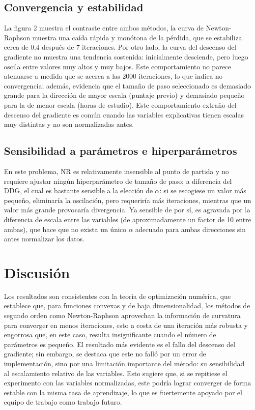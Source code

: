 \subsection{Convergencia y estabilidad}

La figura 2 muestra el contraste entre ambos métodos, la curva de Newton-Raphson muestra una caída rápida y monótona de la pérdida, que se estabiliza cerca de 0,4 después de 7 iteraciones. Por otro lado, la curva del descenso del gradiente no muestra una tendencia sostenida: inicialmente desciende, pero luego oscila entre valores muy altos y muy bajos. Este comportamiento no parece atenuarse a medida que se acerca a las 2000 iteraciones, lo que indica no convergencia; además, evidencia que el tamaño de paso seleccionado es demasiado grande para la dirección de mayor escala (puntaje previo) y demasiado pequeño para la de menor escala (horas de estudio). Este comportamiento extraño del descenso del gradiente es común cuando las variables explicativas tienen escalas muy distintas y no son normalizadas antes.

\subsection{Sensibilidad a parámetros e hiperparámetros}

En este problema, NR es relativamente insensible al punto de partida y no requiere ajustar ningún hiperparámetro de tamaño de paso; a diferencia del DDG, el cual es bastante sensible a la elección de $\alpha$: si se escogiese un valor más pequeño, eliminaría la oscilación, pero requeriría más iteraciones, mientras que un valor más grande provocaría divergencia. Ya sensible de por sí, es agravada por la diferencia de escala entre las variables (de aproximadamente un factor de 10 entre ambas), que hace que no exista un único $\alpha$ adecuado para ambas direcciones sin antes normalizar los datos.

\section{Discusión}

Los resultados son consistentes con la teoría de optimización numérica, que establece que, para funciones convexas y de baja dimensionalidad, los métodos de segundo orden como Newton-Raphson aprovechan la información de curvatura para converger en menos iteraciones, esto a costa de una iteración más robusta y engorrosa que, en este caso, resulta insignificante cuando el número de parámetros es pequeño. El resultado más evidente es el fallo del descenso del gradiente; sin embargo, se destaca que este no falló por un error de implementación, sino por una limitación importante del método: su sensibilidad al escalamiento relativo de las variables. Esto sugiere que, si se repitiese el experimento con las variables normalizadas, este podría lograr converger de forma estable con la misma tasa de aprendizaje, lo que es fuertemente apoyado por el equipo de trabajo como trabajo futuro.


